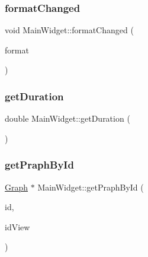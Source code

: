 \hypertarget{class_main_widget_ab380a0a8574e1054dd6bcfd27fc903ec}{}\label{class_main_widget_ab380a0a8574e1054dd6bcfd27fc903ec} 
\subsubsection{\texorpdfstring{format\+Changed}{formatChanged}}
{\footnotesize\ttfamily void Main\+Widget\+::format\+Changed (\begin{DoxyParamCaption}\item[{const Q\+Audio\+Format \&}]{format }\end{DoxyParamCaption})\hspace{0.3cm}{\ttfamily [slot]}}

\hypertarget{class_main_widget_a13ebd72ba1fe175cf326525399e891ac}{}\label{class_main_widget_a13ebd72ba1fe175cf326525399e891ac} 
\subsubsection{\texorpdfstring{get\+Duration}{getDuration}}
{\footnotesize\ttfamily double Main\+Widget\+::get\+Duration (\begin{DoxyParamCaption}{ }\end{DoxyParamCaption})\hspace{0.3cm}{\ttfamily [slot]}}

\hypertarget{class_main_widget_a5f07ccab510c6d5674b0a301ce0b9712}{}\label{class_main_widget_a5f07ccab510c6d5674b0a301ce0b9712} 
\subsubsection{\texorpdfstring{get\+Praph\+By\+Id}{getPraphById}}
{\footnotesize\ttfamily \hyperlink{class_graph}{Graph} $\ast$ Main\+Widget\+::get\+Praph\+By\+Id (\begin{DoxyParamCaption}\item[{int}]{id,  }\item[{int}]{id\+View }\end{DoxyParamCaption})\hspace{0.3cm}{\ttfamily [slot]}}

